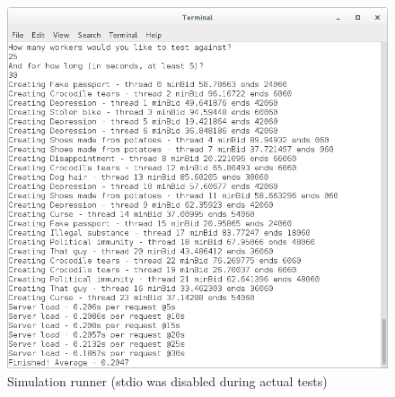 \documentclass[10pt]{article}
\begin{document}
\begin{figure}[h]
\begin{center}
\includegraphics[scale=0.25]{25-30.png}
\caption{Simulation runner (stdio was disabled during actual tests)}
\end{center}
\end{figure}

\pagebreak
\end{document}
